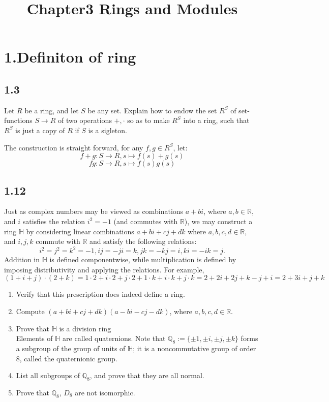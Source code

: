 \documentclass[a4paper, pdf, 12pt]{article}
\title{Chapter3 Rings and Modules}
\makeatletter
\renewenvironment{proof}[1][\proofname]{\par
  \pushQED{\qed}%
  \normalfont \topsep6\p@\@plus6\p@\relax
  \trivlist
  \item[%
    \hskip\labelsep
    \normalfont\bfseries %
    #1%
    \@addpunct{.}%
  ]\ignorespaces
}{%
  \popQED\endtrivlist\@endpefalse
}
\let\qed\relax %
\DeclareRobustCommand{\qed}{%
  \ifmmode \mathqed
  \else
    \leavevmode\unskip\penalty\@M\hbox{}\nobreak\hspace{.5em minus .1em}%
    \hbox{\qedsymbol}%
  \fi
}
\makeatother
\begin{document}
\section*{1.Definiton of ring}
\subsection*{1.3} 
Let $R$ be a ring, and let $S$ be any set. Explain how to endow the set $R^{S}$ of
set-functions $S \rightarrow R$ of two operations $+, ·$ so as to make $R^{S}$ into a ring, such that
$R^{S}$ is just a copy of $R$ if $S$ is a sigleton.
\begin{proof}
  The construction is straight forward, for any $f, g\in R^{S}$, let:
  $$
  f+g: S\rightarrow R, s\mapsto f(s) + g(s)
  $$
  $$
  fg: S\rightarrow R, s\mapsto f(s)g(s)
  $$
\end{proof}

\subsection*{1.12}
Just as complex numbers may be viewed as combinations $a + bi$, where $a, b \in \mathbb{R}$, and $i$ satisﬁes the relation 
$i^2 = −1$ (and commutes with $\mathbb{R}$), we may construct a ring $\mathbb{H}$ by considering linear 
combinations $a + bi + cj + dk$ where $a, b, c, d \in \mathbb{R}$, and $i, j, k$ commute with $\mathbb{R}$ and 
satisfy the following relations:
$$
i^2 = j^2 = k^2 = -1 , ij = -ji = k , jk = -kj = i , ki = -ik = j .
$$
\noindent
Addition in $\mathbb{H}$ is deﬁned componentwise, while multiplication is deﬁned by imposing distributivity 
and applying the relations. For example,
$$
(1+i+j)·(2+k) = 1·2+i·2+j·2+1·k+i·k+j·k = 2+2i+2j+k−j+i = 2+3i+j+k
$$
\noindent
\begin{enumerate}[leftmargin=0cm,itemindent=.2cm,labelwidth=\itemindent,labelsep=0.2cm,align=right,label=(\roman*)]
  \item Verify that this prescription does indeed deﬁne a ring.
  \item Compute $(a + bi + cj + dk)(a-bi-cj-dk)$, where $a, b, c, d \in \mathbb{R}$.
  \item Prove that $\mathbb{H}$ is a division ring\\
  Elements of $\mathbb{H}$ are called quaternions. Note that $\mathbb{Q}_8 := \{ \pm1, \pm i, \pm j, \pm k \}$ forms a subgroup of the group 
  of units of $\mathbb{H}$; it is a noncommutative group of order 8, called the quaternionic group.
  \item List all subgroups of $\mathbb{Q}_8$, and prove that they are all normal.
  \item Prove that $\mathbb{Q}_8$, $D_8$ are not isomorphic.
\end{enumerate}
\end{document}
